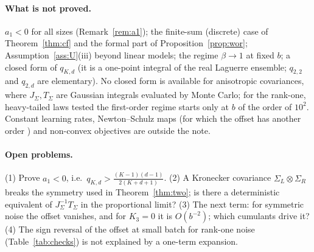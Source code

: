 \documentclass[10pt]{article}
\theoremstyle{definition}
\theoremstyle{remark}
\begin{document}
\paragraph{What is not proved.} $a_1<0$ for all sizes (Remark~\ref{rem:a1}); the finite-sum (discrete) case of
Theorem~\ref{thm:cf} and the formal part of Proposition~\ref{prop:wor}; Assumption~\ref{ass:U}(iii) beyond linear
models; the regime $\beta\to1$ at fixed $b$; a closed form of $q_{K,d}$ (it is a one-point integral of the real Laguerre
ensemble; $q_{2,2}$ and $q_{2,d}$ are elementary). No closed form is available for anisotropic covariances, where
$J_\Sigma,T_\Sigma$ are Gaussian integrals evaluated by Monte Carlo; for the rank-one, heavy-tailed laws tested the
first-order regime starts only at $b$ of the order of $10^2$. Constant learning rates, Newton--Schulz maps (for which
the offset has another order \cite{ddj}) and non-convex objectives are outside the note.

\paragraph{Open problems.} (1) Prove $a_1<0$, i.e.\ $q_{K,d}>\frac{(K-1)(d-1)}{2(K+d+1)}$. (2) A Kronecker covariance
$\Sigma_L\otimes\Sigma_R$ breaks the symmetry used in Theorem~\ref{thm:two}; is there a deterministic equivalent of
$J_\Sigma^{-1}T_\Sigma$ in the proportional limit? (3) The next term: for symmetric noise the offset vanishes, and for
$K_3=0$ it is $O(b^{-2})$; which cumulants drive it? (4) The sign reversal of the offset at small batch for rank-one
noise (Table~\ref{tab:checks}) is not explained by a one-term expansion.
\end{document}
